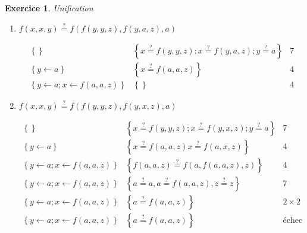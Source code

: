 \documentclass{article}
\theoremstyle{plain}
\newtheorem{exo}{Exercice}%
\begin{document}
\newpage
\begin{exo} Unification
\begin{enumerate}
    \item $f(x, x, y) \overset{?}{=} f(f(y, y, z), f(y, a, z), a)$

    \begin{align*}
        \left\{\right\}                 & \left\{ x \overset{?}{=} f(y, y, z);
                                                x \overset{?}{=} f(y, a, z);
                                                y \overset{?}{=} a\right\} & 7\\
        \left\{ y \leftarrow a\right\}  & \left\{   x \overset{?}{=} f(a, a, z)\right\} & 4\\
        \left\{ y \leftarrow a;
                x \leftarrow f(a, a, z)\right\}   & \left\{\right\} & 4
    \end{align*}

    \item $f(x, x, y) \overset{?}{=} f(f(y, y, z), f(y, x, z), a)$

    \begin{align*}
        \left\{\right\}                 & \left\{ x \overset{?}{=} f(y, y, z);
                                                x \overset{?}{=} f(y, x, z);
                                                y \overset{?}{=} a\right\} & 7\\
        \left\{ y \leftarrow a\right\}  & \left\{ x \overset{?}{=} f(a, a, z)
                                                x \overset{?}{=} f(a, x, z)\right\} & 4\\
        \left\{ y \leftarrow a;
                x \leftarrow f(a, a, z)\right\} & \left\{f(a, a, z) \overset{?}{=}
                                                        f(a, f(a, a, z), z)\right\}
                & 4 \\
        \left\{ y \leftarrow a;
                x \leftarrow f(a, a, z)\right\} & \left\{a \overset{?}{=} a,
                                                        a \overset{?}{=} f(a, a, z),
                                                        z \overset{?}{=} z\right\}
                & 7 \\
        \left\{ y \leftarrow a;
                x \leftarrow f(a, a, z)\right\} & \left\{a \overset{?}{=} f(a, a, z)\right\}
                & 2\times2 \\
        \left\{ y \leftarrow a;
                x \leftarrow f(a, a, z)\right\} & \left\{a \overset{?}{=} f(a, a, z)\right\}
                & \text{échec 6} \\
    \end{align*}
\end{enumerate}
\end{exo}
\end{document}
